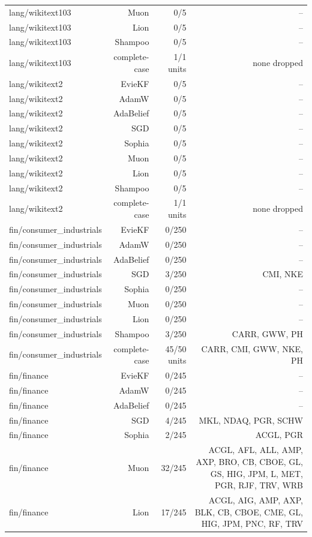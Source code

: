 \begin{table}[t]
\begin{tabular}{lrrr}
lang/wikitext103 & Muon & 0/5 & -- \\
lang/wikitext103 & Lion & 0/5 & -- \\
lang/wikitext103 & Shampoo & 0/5 & -- \\
lang/wikitext103 & complete-case & 1/1 units & none dropped \\
lang/wikitext2 & EvieKF & 0/5 & -- \\
lang/wikitext2 & AdamW & 0/5 & -- \\
lang/wikitext2 & AdaBelief & 0/5 & -- \\
lang/wikitext2 & SGD & 0/5 & -- \\
lang/wikitext2 & Sophia & 0/5 & -- \\
lang/wikitext2 & Muon & 0/5 & -- \\
lang/wikitext2 & Lion & 0/5 & -- \\
lang/wikitext2 & Shampoo & 0/5 & -- \\
lang/wikitext2 & complete-case & 1/1 units & none dropped \\
fin/consumer\_industrials & EvieKF & 0/250 & -- \\
fin/consumer\_industrials & AdamW & 0/250 & -- \\
fin/consumer\_industrials & AdaBelief & 0/250 & -- \\
fin/consumer\_industrials & SGD & 3/250 & CMI, NKE \\
fin/consumer\_industrials & Sophia & 0/250 & -- \\
fin/consumer\_industrials & Muon & 0/250 & -- \\
fin/consumer\_industrials & Lion & 0/250 & -- \\
fin/consumer\_industrials & Shampoo & 3/250 & CARR, GWW, PH \\
fin/consumer\_industrials & complete-case & 45/50 units & CARR, CMI, GWW, NKE, PH \\
fin/finance & EvieKF & 0/245 & -- \\
fin/finance & AdamW & 0/245 & -- \\
fin/finance & AdaBelief & 0/245 & -- \\
fin/finance & SGD & 4/245 & MKL, NDAQ, PGR, SCHW \\
fin/finance & Sophia & 2/245 & ACGL, PGR \\
fin/finance & Muon & 32/245 & ACGL, AFL, ALL, AMP, AXP, BRO, CB, CBOE, GL, GS, HIG, JPM, L, MET, PGR, RJF, TRV, WRB \\
fin/finance & Lion & 17/245 & ACGL, AIG, AMP, AXP, BLK, CB, CBOE, CME, GL, HIG, JPM, PNC, RF, TRV \\

\end{tabular}
\end{table}
